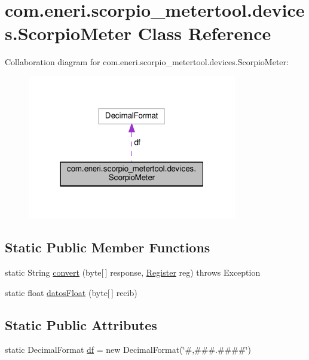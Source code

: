 \hypertarget{classcom_1_1eneri_1_1scorpio__metertool_1_1devices_1_1_scorpio_meter}{}\section{com.\+eneri.\+scorpio\+\_\+metertool.\+devices.\+Scorpio\+Meter Class Reference}
\label{classcom_1_1eneri_1_1scorpio__metertool_1_1devices_1_1_scorpio_meter}


Collaboration diagram for com.\+eneri.\+scorpio\+\_\+metertool.\+devices.\+Scorpio\+Meter\+:
\nopagebreak
\begin{figure}[H]
\begin{center}
\leavevmode
\includegraphics[width=259pt]{classcom_1_1eneri_1_1scorpio__metertool_1_1devices_1_1_scorpio_meter__coll__graph}
\end{center}
\end{figure}
\subsection*{Static Public Member Functions}
\begin{DoxyCompactItemize}
\item 
static String \hyperlink{classcom_1_1eneri_1_1scorpio__metertool_1_1devices_1_1_scorpio_meter_a2c175345cfb7945a2d9909c1be5fffdb}{convert} (byte\mbox{[}$\,$\mbox{]} response, \hyperlink{enumcom_1_1eneri_1_1scorpio__metertool_1_1devices_1_1_register}{Register} reg)  throws Exception   
\item 
static float \hyperlink{classcom_1_1eneri_1_1scorpio__metertool_1_1devices_1_1_scorpio_meter_a4c8349f5fbc92d6013371b9c38461e60}{datos\+Float} (byte\mbox{[}$\,$\mbox{]} recib)
\end{DoxyCompactItemize}
\subsection*{Static Public Attributes}
\begin{DoxyCompactItemize}
\item 
static Decimal\+Format \hyperlink{classcom_1_1eneri_1_1scorpio__metertool_1_1devices_1_1_scorpio_meter_ae747f921c6b265d8959f59db74e2a976}{df} = new Decimal\+Format(\char`\"{}\#,\#\#\#.\#\#\#\#\char`\"{})
\end{DoxyCompactItemize}


